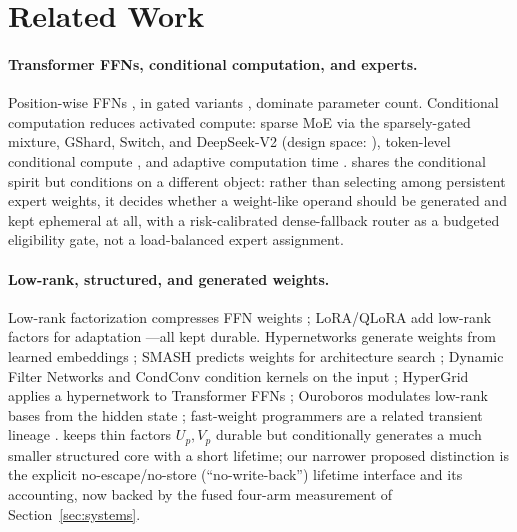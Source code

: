 \section{Related Work}
\label{sec:related}

\paragraph{Transformer FFNs, conditional computation, and experts.}
Position-wise FFNs \cite{vaswani2017attention}, in gated variants
\cite{shazeer2020gptj}, dominate parameter count. Conditional computation
reduces activated compute: sparse MoE via the sparsely-gated mixture,
GShard, Switch, and DeepSeek-V2
\cite{shazeer2017outrageously,lepikhin2021gshard,fedus2022switch,deepseek2024v2}
(design space:
\cite{fedus2022review,dai2024deepseekmoe}), token-level conditional compute
\cite{raposo2024mod}, and adaptive computation time
\cite{graves2016act}. \mwg{} shares the conditional spirit but conditions
on a different object: rather than selecting among persistent expert
weights, it decides whether a weight-like operand should be generated and
kept ephemeral at all, with a risk-calibrated dense-fallback router as a
budgeted eligibility gate, not a load-balanced expert assignment.

\paragraph{Low-rank, structured, and generated weights.}
Low-rank factorization compresses FFN weights
\cite{sainath2013lowrank,dao2022monarch}; LoRA/QLoRA add low-rank
factors for adaptation \cite{hu2022lora,dettmers2023qlora}---all kept
durable. Hypernetworks generate weights from learned embeddings
\cite{ha2017hypernetworks}; SMASH predicts weights for architecture
search \cite{brock2018smash}; Dynamic Filter Networks and CondConv
condition kernels on the input
\cite{debrabandere2016dynamic,yang2019condconv}; HyperGrid applies a
hypernetwork to Transformer FFNs \cite{tay2021hypergrid}; Ouroboros
modulates low-rank bases from the hidden state \cite{jaber2026ouroboros};
fast-weight programmers are a related transient lineage
\cite{schlag2021fastweights}. \mwg{} keeps thin factors $U_p,V_p$
durable but conditionally generates a much smaller structured core with
a short lifetime; our narrower proposed distinction is the explicit
no-escape/no-store (``no-write-back'') lifetime interface and its
accounting, now backed by the fused four-arm measurement of
Section~\ref{sec:systems}.

